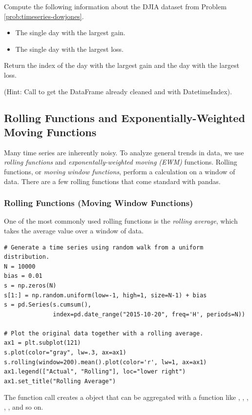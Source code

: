 \begin{problem}
Compute the following information about the DJIA dataset from Problem \ref{prob:timeseries-dowjones}.
\begin{itemize}
    \item The single day with the largest gain.
    \item The single day with the largest loss.
\end{itemize}
Return the index of the day with the largest gain and the day with the largest loss.

(Hint: Call  to get the DataFrame already cleaned and with DatetimeIndex).
\end{problem}

\subsection*{Rolling Functions and Exponentially-Weighted Moving Functions}

Many time series are inherently noisy.
To analyze general trends in data, we use \emph{rolling functions} and \emph{exponentally-weighted moving (EWM)} functions.
Rolling functions, or \emph{moving window functions}, perform a calculation on a window of data.
There are a few rolling functions that come standard with pandas.

\subsubsection*{Rolling Functions (Moving Window Functions)}

One of the most commonly used rolling functions is the \emph{rolling average}, which takes the average value over a window of data.

\begin{lstlisting}
# Generate a time series using random walk from a uniform distribution.
N = 10000
bias = 0.01
s = np.zeros(N)
s[1:] = np.random.uniform(low=-1, high=1, size=N-1) + bias
s = pd.Series(s.cumsum(),
              index=pd.date_range("2015-10-20", freq='H', periods=N))

# Plot the original data together with a rolling average.
ax1 = plt.subplot(121)
s.plot(color="gray", lw=.3, ax=ax1)
s.rolling(window=200).mean().plot(color='r', lw=1, ax=ax1)
ax1.legend(["Actual", "Rolling"], loc="lower right")
ax1.set_title("Rolling Average")
\end{lstlisting}

The function call  creates a  object that can be aggregated with a function like , , , , , and so on.

